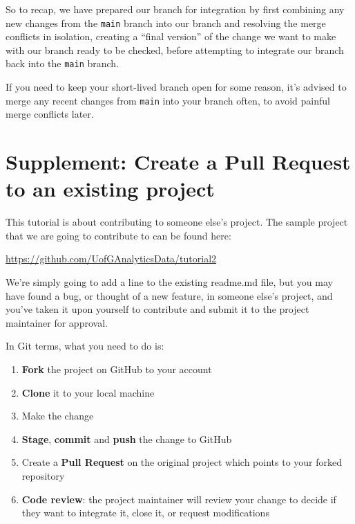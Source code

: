 \documentclass[
  letterpaper,
  DIV=11,
  numbers=noendperiod]{scrartcl}
\providecommand{\tightlist}{%
  \setlength{\itemsep}{0pt}\setlength{\parskip}{0pt}}\usepackage{longtable,booktabs,array}
\begin{document}
So to recap, we have prepared our branch for integration by first
combining any new changes from the \texttt{main} branch into our branch
and resolving the merge conflicts in isolation, creating a ``final
version'' of the change we want to make with our branch ready to be
checked, before attempting to integrate our branch back into the
\texttt{main} branch.

If you need to keep your short-lived branch open for some reason, it's
advised to merge any recent changes from \texttt{main} into your branch
often, to avoid painful merge conflicts later.

\section{Supplement: Create a Pull Request to an existing
project}\label{supplement-create-a-pull-request-to-an-existing-project}

This tutorial is about contributing to someone else's project. The
sample project that we are going to contribute to can be found here:

\url{https://github.com/UofGAnalyticsData/tutorial2}

We're simply going to add a line to the existing readme.md file, but you
may have found a bug, or thought of a new feature, in someone else's
project, and you've taken it upon yourself to contribute and submit it
to the project maintainer for approval.

In Git terms, what you need to do is:

\begin{enumerate}
\def\labelenumi{\arabic{enumi}.}
\tightlist
\item
  \textbf{Fork} the project on GitHub to your account
\item
  \textbf{Clone} it to your local machine
\item
  Make the change
\item
  \textbf{Stage}, \textbf{commit} and \textbf{push} the change to GitHub
\item
  Create a \textbf{Pull Request} on the original project which points to
  your forked repository
\item
  \textbf{Code review}: the project maintainer will review your change
  to decide if they want to integrate it, close it, or request
  modifications
\end{enumerate}
\end{document}
